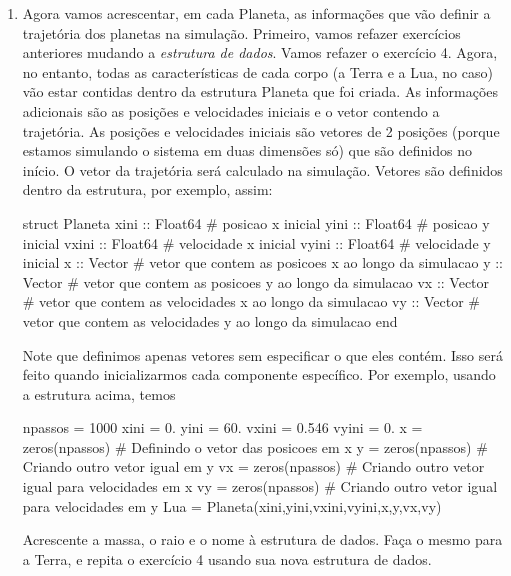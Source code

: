 \documentclass[10pt,a4paper,ssfamily]{exam}
\begin{document}
\begin{enumerate}
\item
Agora vamos acrescentar, em cada Planeta, as informações que vão definir
a trajetória dos planetas na simulação. Primeiro, vamos refazer
exercícios anteriores mudando a {\it estrutura de dados}. Vamos refazer
o exercício 4. Agora, no entanto, todas as características de cada corpo
(a Terra e a Lua, no caso) vão estar contidas dentro da estrutura
Planeta que foi criada. As informações adicionais são as posições e
velocidades iniciais e o vetor contendo a trajetória. As posições e
velocidades iniciais são vetores de 2 posições (porque estamos simulando
o sistema em duas dimensões só) que são definidos no início. O vetor da
trajetória será calculado na simulação. Vetores são definidos dentro da
estrutura, por exemplo, assim:
\begin{code}
struct Planeta
  xini :: Float64  # posicao x inicial
  yini :: Float64  # posicao y inicial
  vxini :: Float64 # velocidade x inicial
  vyini :: Float64 # velocidade y inicial
  x :: Vector{}     # vetor que contem as posicoes x ao longo da simulacao
  y :: Vector{}     # vetor que contem as posicoes y ao longo da simulacao 
  vx :: Vector{}    # vetor que contem as velocidades x ao longo da simulacao  
  vy :: Vector{}    # vetor que contem as velocidades y ao longo da simulacao   
end
\end{code}
Note que definimos apenas vetores sem especificar o que eles contém.
Isso será feito quando inicializarmos cada componente específico. Por
exemplo, usando a estrutura acima, temos 
\begin{code}
npassos = 1000
xini = 0. 
yini = 60.
vxini = 0.546 
vyini = 0.
x = zeros(npassos) # Definindo o vetor das posicoes em x
y = zeros(npassos) # Criando outro vetor igual em y
vx = zeros(npassos) # Criando outro vetor igual para velocidades em x
vy = zeros(npassos) # Criando outro vetor igual para velocidades em y
Lua = Planeta(xini,yini,vxini,vyini,x,y,vx,vy)
\end{code}
Acrescente a massa, o raio e o nome à estrutura de dados. 
Faça o mesmo para a Terra, e repita o exercício 4 usando sua nova
estrutura de dados.

\end{enumerate}
\end{document}

